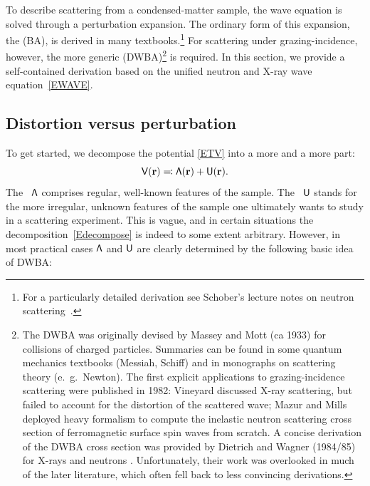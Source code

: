To describe scattering from a condensed-matter sample,
%
%
%
the wave equation is solved through a perturbation expansion.
The ordinary form of this expansion, the  (BA),
%
%
is derived in many textbooks.\footnote
{For a particularly detailed derivation
see Schober's lecture notes on neutron scattering~\cite{Sch14}.}
For scattering under grazing-incidence,
%
however, the more generic
%
 (DWBA)\footnote
{The DWBA was originally devised by Massey and Mott (ca 1933)
for collisions of charged particles.
Summaries can be found in some quantum mechanics textbooks (Messiah, Schiff)
and in monographs on scattering theory (e.~g.\ Newton).
The first explicit applications to grazing-incidence scattering
were published in 1982:
Vineyard \cite{Vin82} discussed X-ray scattering,
but failed to account for the distortion of the scattered wave;
Mazur and Mills \cite{MaMi82} deployed heavy formalism
to compute the inelastic neutron scattering cross section
of ferromagnetic surface spin waves from scratch.
A concise derivation of the DWBA cross section
was provided by Dietrich and Wagner (1984/85)
for X-rays \cite{DiWa84} and neutrons \cite{DiWa85}.
Unfortunately, their work was overlooked in much of the later literature,
which often fell back to less convincing derivations.}
is required.
In this section, we provide a self-contained derivation
based on the unified neutron and X-ray wave equation~\cref{EWAVE}.

\subsection{Distortion versus perturbation}\label{Sdecompose}

To get started,
we decompose the potential \cref{ETV}
into a more  and a more  part:
\begin{equation}\label{Edecompose}
  \mathsf{V}(\mathbf{r}) \eqqcolon \mathsf{\Lambda}(\mathbf{r}) + \mathsf{U}(\mathbf{r}).
\end{equation}
The ~$\mathsf{\Lambda}$
%
%
comprises regular, well-known features of the sample.
The ~$\mathsf{U}$
%
%
%
stands for the more irregular, unknown features of the sample
one ultimately wants to study in a scattering experiment.
This is vague,
and in certain situations the decomposition~\cref{Edecompose} is indeed
to some extent arbitrary.
However, in most practical cases $\mathsf{\Lambda}$ and $\mathsf{U}$ are clearly determined by
the following basic idea of DWBA:


